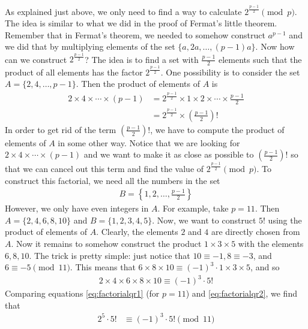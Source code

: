 \documentclass[main.tex]{subfile}
\begin{document}
	\begin{solution}
		As explained just above, we only need to find a way to calculate $2^\frac{p-1}{2} \pmod p$. The idea is similar to what we did in the proof of Fermat's little theorem. Remember that in Fermat's theorem, we needed to somehow construct $a^{p-1}$ and we did that by multiplying elements of the set $\{a,2a,\ldots,(p-1)a\}$. Now how can we construct $2^\frac{p-1}{2}$? The idea is to find a set with  $\frac{p-1}{2}$ elements such that the product of all elements has the factor $2^\frac{p-1}{2}$. One possibility is to consider the set $A=\{2, 4, \ldots, p-1\}$. Then the product of elements of $A$ is
		\begin{align}\label{eq:factorialqr1}
			2 \times 4 \times \cdots \times (p-1) &= 2^\frac{p-1}{2} \times 1 \times 2 \times \cdots \times \frac{p-1}{2} \nonumber\\
			& = 2^\frac{p-1}{2} \times \left(\frac{p-1}{2}\right)!
		\end{align}
		In order to get rid of the term $ \left(\frac{p-1}{2}\right)!$, we have to compute the product of elements of $A$ in some other way. Notice that we are looking for $2 \times 4 \times \cdots \times (p-1)$ and we want to make it as close as possible to $ \left(\frac{p-1}{2}\right)!$ so that we can cancel out this term and find the value of $2^\frac{p-1}{2} \pmod p$. To construct this factorial, we need all the numbers in the set
			\begin{align*}
				B=\left\{1, 2, \ldots, \frac{p-1}{2}\right\}
			\end{align*}
		However, we only have even integers in $A$. For example, take $p=11$. Then $A=\{2,4,6,8,10\}$ and $B=\{1,2,3,4,5\}$. Now, we want to construct $5!$ using the product of elements of $A$. Clearly, the elements $2$ and $4$ are directly chosen from $A$. Now it remains to somehow construct the product $1\times 3 \times 5$ with the elements $6,8,10$. The trick is pretty simple: just notice that $10 \equiv -1, 8 \equiv -3$, and $6 \equiv -5 \pmod{11}$. This means that $ 6 \times 8 \times 10 \equiv (-1)^3  \cdot 1 \times 3 \times 5$, and so
		\begin{align}\label{eq:factorialqr2}
		2 \times 4 \times 6 \times 8 \times 10 \equiv (-1)^3 \cdot 5!
		\end{align}
		Comparing equations \eqref{eq:factorialqr1} (for $p=11$) and \eqref{eq:factorialqr2}, we find that
		\begin{align*}
		2^5 \cdot 5!
			& \equiv (-1)^3 \cdot 5! \pmod{11}\\

\end{align*}
\end{solution}
\end{document}

